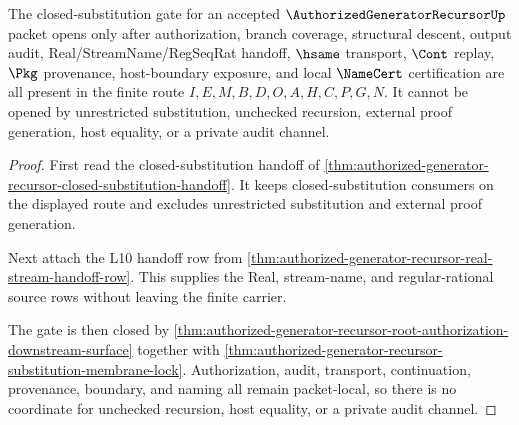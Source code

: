 \begin{theorem}
\label{thm:authorized-generator-recursor-closed-substitution-gate-row}
The closed-substitution gate for an accepted $\AuthorizedGeneratorRecursorUp$ packet opens only after authorization, branch coverage, structural descent, output audit, Real/StreamName/RegSeqRat handoff, $\hsame$ transport, $\Cont$ replay, $\Pkg$ provenance, host-boundary exposure, and local $\NameCert$ certification are all present in the finite route $I,E,M,B,D,O,A,H,C,P,G,N$. It cannot be opened by unrestricted substitution, unchecked recursion, external proof generation, host equality, or a private audit channel.
\end{theorem}
\begin{proof}
First read the closed-substitution handoff of \autoref{thm:authorized-generator-recursor-closed-substitution-handoff}. It keeps closed-substitution consumers on the displayed route and excludes unrestricted substitution and external proof generation.

Next attach the L10 handoff row from \autoref{thm:authorized-generator-recursor-real-stream-handoff-row}. This supplies the Real, stream-name, and regular-rational source rows without leaving the finite carrier.

The gate is then closed by \autoref{thm:authorized-generator-recursor-root-authorization-downstream-surface} together with \autoref{thm:authorized-generator-recursor-substitution-membrane-lock}. Authorization, audit, transport, continuation, provenance, boundary, and naming all remain packet-local, so there is no coordinate for unchecked recursion, host equality, or a private audit channel.
\end{proof}

